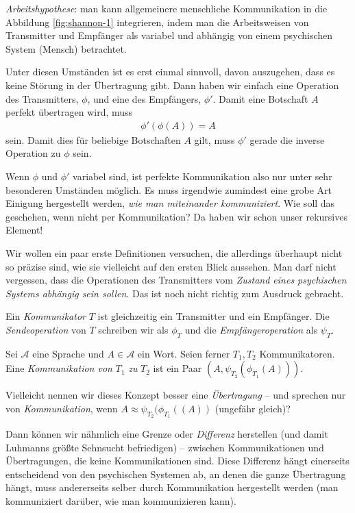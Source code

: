 \documentclass[a4paper, 10pt]{amsart}
\begin{document}
\emph{Arbeitshypothese}: man kann allgemeinere menschliche Kommunikation in die Abbildung \ref{fig:shannon-1} integrieren, indem man die Arbeitsweisen von Transmitter und Empf\"anger als variabel und abh\"angig von einem psychischen System (Mensch) betrachtet.

Unter diesen Umst\"anden ist es erst einmal sinnvoll, davon auszugehen, dass es keine St\"orung in der \"Ubertragung gibt. Dann haben wir einfach eine Operation des Transmitters, $\phi$, und eine des Empf\"angers, $\phi'$. Damit eine Botschaft $A$ perfekt \"ubertragen wird, muss
\begin{align}
\phi'(\phi(A)) = A
\end{align}
sein. Damit dies f\"ur beliebige Botschaften $A$ gilt, muss $\phi'$ gerade die inverse Operation zu $\phi$ sein.

Wenn $\phi$ und $\phi'$ variabel sind, ist perfekte Kommunikation also nur unter sehr besonderen Umst\"anden m\"oglich. Es muss irgendwie zumindest eine grobe Art Einigung hergestellt werden, \emph{wie man miteinander kommuniziert}. Wie soll das geschehen, wenn nicht per Kommunikation? Da haben wir schon unser rekursives Element!

Wir wollen ein paar erste Definitionen versuchen, die allerdings \"uberhaupt nicht so pr\"azise sind, wie sie vielleicht auf den ersten Blick aussehen. Man darf nicht vergessen, dass die Operationen des Transmitters vom \emph{Zustand eines psychischen Systems abh\"angig sein sollen}. Das ist noch nicht richtig zum Ausdruck gebracht.
\begin{defn} Ein \emph{Kommunikator} $T$ ist gleichzeitig ein Transmitter und ein Empf\"anger. Die \emph{Sendeoperation} von $T$ schreiben wir als $\phi_T$ und die \emph{Empf\"angeroperation} als $\psi_T$. 
\end{defn}
\begin{defn} Sei $\mathcal{A}$ eine Sprache und $A \in \mathcal{A}$ ein Wort. Seien ferner $T_1, T_2$ Kommunikatoren. Eine \emph{Kommunikation von} $T_1$ \emph{zu} $T_2$ ist ein Paar $(A, \psi_{T_2}(\phi_{T_1}(A)))$.
\end{defn}
Vielleicht nennen wir dieses Konzept besser eine \emph{\"Ubertragung} -- und sprechen nur von \emph{Kommunikation}, wenn $A \approx \psi_{T_2}(\phi_{T_1}((A))$ (ungef\"ahr gleich)?

Dann k\"onnen wir n\"ahmlich eine Grenze oder \emph{Differenz} herstellen (und damit Luhmanns gr\"o{\ss}te Sehnsucht befriedigen) -- zwischen Kommunikationen und \"Ubertragungen, die keine Kommunikationen sind. Diese Differenz h\"angt einerseits entscheidend von den psychischen Systemen ab, an denen die ganze \"Ubertragung h\"angt, muss andererseits selber durch Kommunikation hergestellt werden (man kommuniziert dar\"uber, wie man kommunizieren kann).
\end{document}
